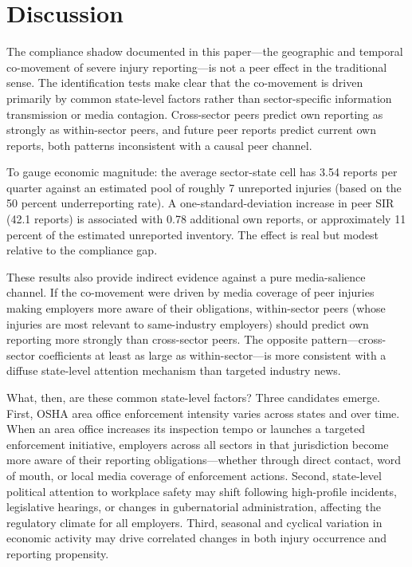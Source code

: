 \documentclass[12pt]{article}
\begin{document}



\section{Discussion}
\label{sec:discussion}

The compliance shadow documented in this paper---the geographic and temporal co-movement of severe injury reporting---is not a peer effect in the traditional sense. The identification tests make clear that the co-movement is driven primarily by common state-level factors rather than sector-specific information transmission or media contagion. Cross-sector peers predict own reporting as strongly as within-sector peers, and future peer reports predict current own reports, both patterns inconsistent with a causal peer channel.

To gauge economic magnitude: the average sector-state cell has 3.54 reports per quarter against an estimated pool of roughly 7 unreported injuries (based on the 50 percent underreporting rate). A one-standard-deviation increase in peer SIR (42.1 reports) is associated with 0.78 additional own reports, or approximately 11 percent of the estimated unreported inventory. The effect is real but modest relative to the compliance gap.

These results also provide indirect evidence against a pure media-salience channel. If the co-movement were driven by media coverage of peer injuries making employers more aware of their obligations, within-sector peers (whose injuries are most relevant to same-industry employers) should predict own reporting more strongly than cross-sector peers. The opposite pattern---cross-sector coefficients at least as large as within-sector---is more consistent with a diffuse state-level attention mechanism than targeted industry news.

What, then, are these common state-level factors? Three candidates emerge. First, OSHA area office enforcement intensity varies across states and over time. When an area office increases its inspection tempo or launches a targeted enforcement initiative, employers across all sectors in that jurisdiction become more aware of their reporting obligations---whether through direct contact, word of mouth, or local media coverage of enforcement actions. Second, state-level political attention to workplace safety may shift following high-profile incidents, legislative hearings, or changes in gubernatorial administration, affecting the regulatory climate for all employers. Third, seasonal and cyclical variation in economic activity may drive correlated changes in both injury occurrence and reporting propensity.
\end{document}

